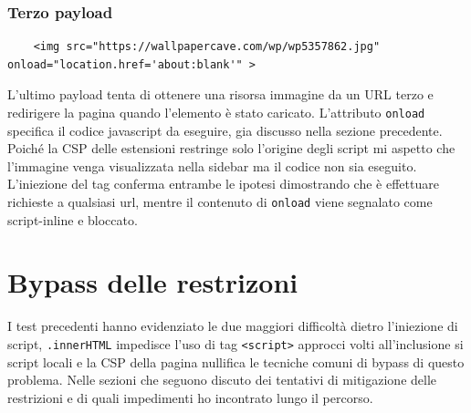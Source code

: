 \documentclass{sapthesis}
\newcommand{\code}[1]{\texttt{#1}}
\newcommand{\attr}[1]{\code{.#1}}
\newcommand{\tagHTML}[1]{\code{<#1>}}
\newcommand{\script}{\tagHTML{script}}
\begin{document}
        \subsubsection{Terzo payload}
            \begin{lstlisting}
    <img src="https://wallpapercave.com/wp/wp5357862.jpg" onload="location.href='about:blank'" >
\end{lstlisting}
            L'ultimo payload tenta di ottenere una risorsa immagine da un URL terzo e redirigere la pagina
            quando l'elemento è stato caricato. L'attributo \code{onload} specifica il codice javascript
            da eseguire, gia discusso nella sezione precedente. Poiché la CSP delle estensioni restringe 
            solo l'origine degli script mi aspetto che l'immagine venga visualizzata nella sidebar ma il
            codice non sia eseguito. L'iniezione del tag conferma entrambe le ipotesi dimostrando che
            è effettuare richieste a qualsiasi url, mentre il contenuto di \code{onload} viene segnalato
            come script-inline e bloccato.\\

    \section{Bypass delle restrizoni}
    \label{sec:attaccando-vuln-bypass}
        I test precedenti hanno evidenziato le due maggiori difficoltà dietro l'iniezione di script,
        \attr{innerHTML} impedisce l'uso di tag \script{}  approcci volti all'inclusione si script locali
        e la CSP della pagina nullifica le tecniche comuni di bypass di questo problema. Nelle sezioni
        che seguono discuto dei tentativi di mitigazione delle restrizioni e di quali impedimenti ho
        incontrato lungo il percorso.
        
\end{document}
